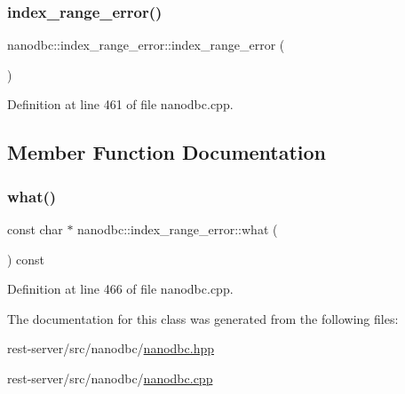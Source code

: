 \subsubsection{\texorpdfstring{index\_range\_error()}{index\_range\_error()}}
{\footnotesize\ttfamily nanodbc\+::index\+\_\+range\+\_\+error\+::index\+\_\+range\+\_\+error (\begin{DoxyParamCaption}{ }\end{DoxyParamCaption})}



Definition at line 461 of file nanodbc.\+cpp.



\subsection{Member Function Documentation}
\mbox{\label{classnanodbc_1_1index__range__error_a3b1ef5a9d3faa236c80c4041a8c74f4e}} 
\subsubsection{\texorpdfstring{what()}{what()}}
{\footnotesize\ttfamily const char $\ast$ nanodbc\+::index\+\_\+range\+\_\+error\+::what (\begin{DoxyParamCaption}{ }\end{DoxyParamCaption}) const\hspace{0.3cm}{\ttfamily [noexcept]}}



Definition at line 466 of file nanodbc.\+cpp.



The documentation for this class was generated from the following files\+:\begin{DoxyCompactItemize}
\item 
rest-\/server/src/nanodbc/\mbox{\hyperlink{nanodbc_8hpp}{nanodbc.\+hpp}}\item 
rest-\/server/src/nanodbc/\mbox{\hyperlink{nanodbc_8cpp}{nanodbc.\+cpp}}\end{DoxyCompactItemize}
